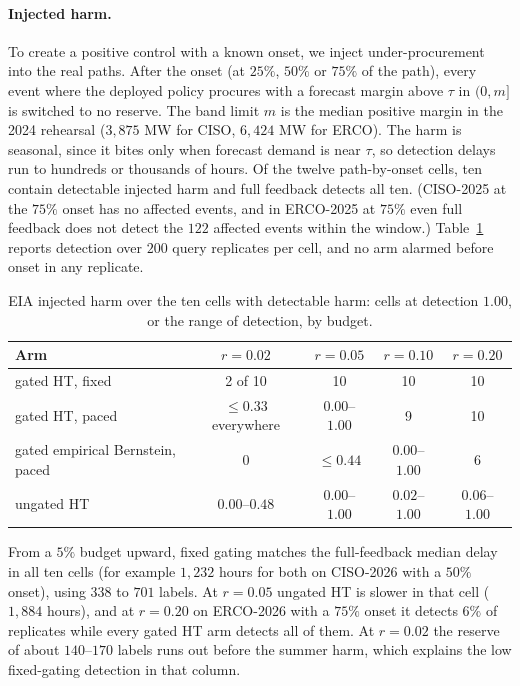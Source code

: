 \paragraph{Injected harm.}
To create a positive control with a known onset, we inject under-procurement into the real paths. After the onset (at $25\%$, $50\%$ or $75\%$ of the path), every event where the deployed policy procures
with a forecast margin above $\tau$ in $(0,m]$ is switched to no reserve. The band limit $m$ is the median positive margin in the 2024 rehearsal ($3{,}875$ MW for CISO, $6{,}424$ MW for ERCO).
The harm is seasonal, since it bites only when forecast demand is near $\tau$, so detection delays run to hundreds or thousands of hours.
Of the twelve path-by-onset cells, ten contain detectable injected harm and full feedback detects all ten.
(CISO-2025 at the $75\%$ onset has no affected events, and in ERCO-2025 at $75\%$ even full feedback does not detect the $122$ affected events within the window.)
Table~\ref{tab:eia} reports detection over $200$ query replicates per cell, and no arm alarmed before onset in any replicate.

\begin{table}[t]
\centering
\caption{EIA injected harm over the ten cells with detectable harm: cells at detection $1.00$, or the range of detection, by budget.}
\label{tab:eia}
\begin{tabular}{lcccc}
\toprule
Arm & $r=0.02$ & $r=0.05$ & $r=0.10$ & $r=0.20$ \\
\midrule
gated HT, fixed & 2 of 10 & 10 & 10 & 10 \\
gated HT, paced & $\le0.33$ everywhere & $0.00$--$1.00$ & 9 & 10 \\
gated empirical Bernstein, paced & 0 & $\le0.44$ & $0.00$--$1.00$ & 6 \\
ungated HT & $0.00$--$0.48$ & $0.00$--$1.00$ & $0.02$--$1.00$ & $0.06$--$1.00$ \\
\bottomrule
\end{tabular}
\end{table}

From a $5\%$ budget upward, fixed gating matches the full-feedback median delay in all ten cells (for example $1{,}232$ hours for both on CISO-2026 with a $50\%$ onset), using $338$ to $701$ labels.
At $r=0.05$ ungated HT is slower in that cell ($1{,}884$ hours), and at $r=0.20$ on ERCO-2026 with a $75\%$ onset it detects $6\%$ of replicates while every gated HT arm detects all of them.
At $r=0.02$ the reserve of about $140$--$170$ labels runs out before the summer harm, which explains the low fixed-gating detection in that column.

